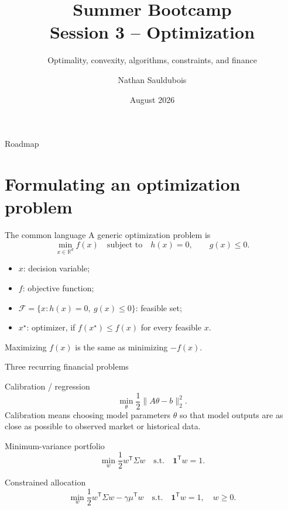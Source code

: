 \documentclass[aspectratio=169,11pt]{beamer}
\title{Summer Bootcamp\\Session 3 -- Optimization}
\subtitle{Optimality, convexity, algorithms, constraints, and finance}
\author{Nathan Sauldubois}
\institute{NYU Finance and Risk Engineering}
\date{August 2026}
\newcommand{\R}{\mathbb{R}}
\newcommand{\trans}{^{\mathsf T}}
\begin{document}
\begin{frame}
  \titlepage
\end{frame}

\begin{frame}{Roadmap}
  \tableofcontents
\end{frame}

\section{Formulating an optimization problem}

\begin{frame}{The common language}
  A generic optimization problem is
  \[
    \min_{x\in\R^d} f(x)
    \quad\text{subject to}\quad
    h(x)=0,\qquad g(x)\leq 0.
  \]

  \begin{itemize}
    \item $x$: decision variable;
    \item $f$: objective function;
    \item $\mathcal F=\{x:h(x)=0,\ g(x)\leq0\}$: feasible set;
    \item $x^\star$: optimizer, if $f(x^\star)\leq f(x)$ for every feasible $x$.
  \end{itemize}

  Maximizing $f(x)$ is the same as minimizing $-f(x)$.
\end{frame}

\begin{frame}{Three recurring financial problems}
  \begin{block}{Calibration / regression}
    \[
      \min_\theta \frac12\|A\theta-b\|_2^2.
    \]
    Calibration means choosing model parameters $\theta$ so that model outputs
    are as close as possible to observed market or historical data.
  \end{block}

  \begin{block}{Minimum-variance portfolio}
    \[
      \min_w \frac12 w\trans\Sigma w
      \quad\text{s.t.}\quad \mathbf 1\trans w=1.
    \]
  \end{block}

  \begin{block}{Constrained allocation}
    \[
      \min_w \frac12 w\trans\Sigma w-\gamma\mu\trans w
      \quad\text{s.t.}\quad \mathbf 1\trans w=1,\quad w\geq0.
    \]
  \end{block}
\end{frame}
\end{document}
